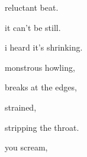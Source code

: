\documentclass[extrafontsizes, 48pt]{memoir}
\newcommand\blankpage{%
    \null
    \thispagestyle{empty}%
    \addtocounter{page}{-1}%
    \newpage}
\begin{document}
	\begin{minipage}{.6\textwidth}
	reluctant beat.
	\end{minipage}
	\newpage

	\begin{minipage}{.6\textwidth}
	it can't be still.
	\end{minipage}
	\newpage

	\begin{minipage}{.6\textwidth}
	i heard it's shrinking.
	\afterpage{\blankpage}
	\end{minipage}
	\newpage

	\begin{minipage}{.6\textwidth}
	monstrous howling,
	\end{minipage}
	\newpage

	\begin{minipage}{.6\textwidth}
	breaks at the edges,
	\end{minipage}
	\newpage

	\begin{minipage}{.6\textwidth}
	strained,
	\end{minipage}
	\newpage

	\begin{minipage}{.6\textwidth}
	stripping the throat.
	\afterpage{\blankpage}
	\end{minipage}
	\newpage

	\begin{minipage}{.6\textwidth}
	you scream,
	\end{minipage}
	\newpage
\end{document}
